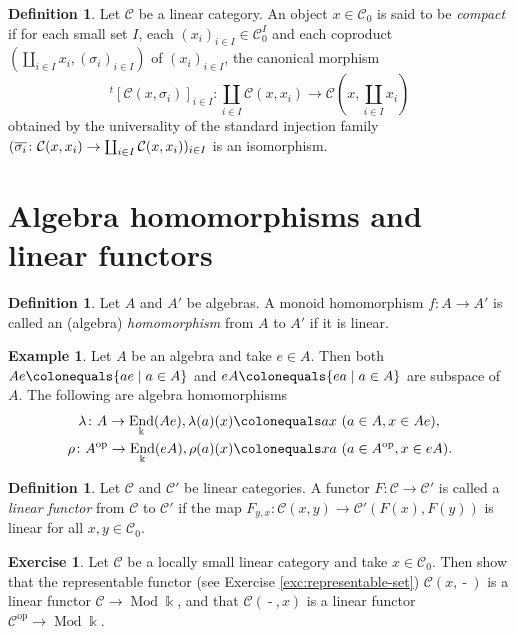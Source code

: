 \documentclass{surv-l}
\numberwithin{equation}{chapter}
\numberwithin{figure}{chapter}
\theoremstyle{plain}
\theoremstyle{definition}
\newtheorem{dfn}[thm]{Definition}
\newtheorem{exm}[thm]{Example}
\newtheorem{exc}[thm]{Exercise}
\theoremstyle{remark}
\DeclareMathOperator{\End}{End}
\DeclareMathOperator{\Mod}{Mod}
\DeclareMathOperator{\blank}{-}
\begin{document}
\begin{dfn}
Let ${\mathcal{C}}$ be a linear category.
An object $x \in {\mathcal{C}}_0$ is said to be \emph{compact}
if
for each small set $I$, each $(x_i)_{i\in I} \in {\mathcal{C}}_0^I$ and each coproduct
$(\coprod_{i\in I}x_i, (\sigma_i)_{i\in I})$ of $(x_i)_{i\in I}$,
the canonical morphism
\[
{}^t[{\mathcal{C}}(x, \sigma_i)]_{i\in I} \colon \coprod_{i\in I}{\mathcal{C}}(x, x_i) \to {\mathcal{C}}(x, \coprod_{i\in I}x_i)\]
obtained by the universality of the standard injection family
$
(\overline{\sigma_i} \colon {\mathcal{C}}(x, x_i) \to \coprod_{i\in I}\linebreak[3] {\mathcal{C}}(x, x_i))_{i\in I}
$
is an isomorphism.
\end{dfn}

\section{Algebra homomorphisms and linear functors}\begin{dfn}
Let $A$ and $A'$ be algebras.
A monoid homomorphism $f\colon A \to A'$ is called
an (algebra) \emph{homomorphism} from $A$ to $A'$
if it is linear.
\end{dfn}

\begin{exm}\label{regular-rep}
Let $A$ be an algebra and take $e \in A$.
Then both $Ae\colonequals \{ae \mid a \in A\}$ and
$eA\colonequals \{ea \mid a \in A\}$ are subspace of $A$.
The following are algebra homomorphisms
\[
\begin{aligned}
\lambda \colon A \to \End_{\Bbbk}(Ae),
\lambda(a)(x)&\colonequals ax\ (a \in A, x \in Ae),\\
\rho \colon A^{\mathrm{op}} \to \End_{\Bbbk}(eA),
\rho(a)(x)&\colonequals xa\ (a \in A^{\mathrm{op}}, x \in eA).
\end{aligned}
\]
\end{exm}

\begin{dfn}\label{dfn:senkei-kansyu}
Let ${\mathcal{C}}$ and ${\mathcal{C}}'$ be linear categories.
A functor $F \colon {\mathcal{C}} \to {\mathcal{C}}'$ is called a \emph{linear functor}
from ${\mathcal{C}}$ to ${\mathcal{C}}'$ if
the map $F_{y,x}\colon {\mathcal{C}}(x,y) \to {\mathcal{C}}'(F(x), F(y))$
is linear for all $x,y \in {\mathcal{C}}_0$.
\end{dfn}

\begin{exc}
Let ${\mathcal{C}}$ be a locally small linear category and take $x \in {\mathcal{C}}_0$.
Then show that the representable functor
(see Exercise \ref{exc:representable-set})
${\mathcal{C}}(x, \blank)$ is a linear functor ${\mathcal{C}} \to \Mod \Bbbk$,
and that
${\mathcal{C}}(\blank, x)$ is a linear functor ${\mathcal{C}}^{\mathrm{op}} \to \Mod \Bbbk$.
\end{exc}
\end{document}
